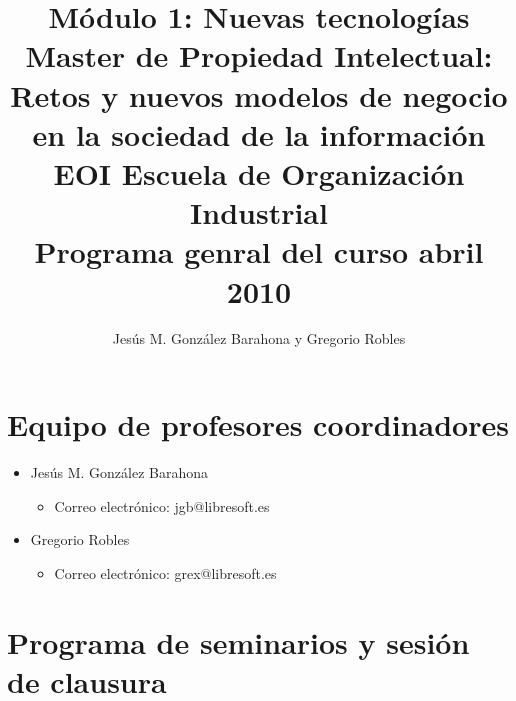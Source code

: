 \documentclass[a4paper,12pt]{article}
\title{Módulo 1: Nuevas tecnologías \\
Master de Propiedad Intelectual: \\
Retos y nuevos modelos de negocio en la sociedad de la información \\
EOI Escuela de Organización Industrial \\
Programa genral del curso abril 2010}
\author{Jesús M. González Barahona y Gregorio Robles}
\begin{document}
\maketitle

\newpage

\tableofcontents

\newpage

\section{Equipo de profesores coordinadores}

\begin{itemize}
\item Jesús M. González Barahona
  \begin{itemize}
  \item Correo electrónico: jgb@libresoft.es
  \end{itemize}
\item Gregorio Robles
  \begin{itemize}
  \item Correo electrónico: grex@libresoft.es
  \end{itemize}
\end{itemize}





\section{Programa de seminarios y sesión de clausura}
\end{document}
